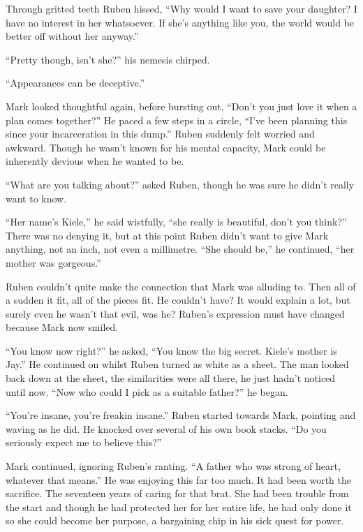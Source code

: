 Through gritted teeth Ruben hissed, ``Why would I want to save your daughter?  I have no interest in her whatsoever.  If she's anything like you, the world would be better off without her anyway.''

``Pretty though, isn't she?'' his nemesis chirped.

``Appearances can be deceptive.''

Mark looked thoughtful again, before bursting out,  ``Don't you just love it when a plan comes together?'' He paced a few steps in a circle, ``I've been planning this since your incarceration in this dump.''  Ruben suddenly felt worried and awkward.  Though he wasn't known for his mental capacity, Mark could be inherently devious when he wanted to be.  

``What are you talking about?'' asked Ruben, though he was sure he didn't really want to know.

``Her name's Kiele,'' he said wistfully, ``she really is beautiful, don't you think?''  There was no denying it, but at this point Ruben didn't want to give Mark anything, not an inch, not even a millimetre.  ``She should be,'' he continued, ``her mother was gorgeous.''

Ruben couldn't quite make the connection that Mark was alluding to.  Then all of a sudden it fit, all of the pieces fit.  He couldn't have?  It would explain a lot, but surely even he wasn't that evil, was he?  Ruben's expression must have changed because Mark now smiled.  

``You know now right?'' he asked, ``You know the big secret.  Kiele's mother is Jay.''  He continued on whilst Ruben turned as white as a sheet.  The man looked back down at the sheet, the similarities were all there, he just hadn't noticed until now.  ``Now who could I pick as a suitable father?'' he began.  

``You're insane, you're freakin insane.''  Ruben started towards Mark, pointing and waving as he did.  He knocked over several of his own book stacks.  ``Do you seriously expect me to believe this?''  

Mark continued, ignoring Ruben's ranting.  ``A father who was strong of heart, whatever that means.''  He was enjoying this far too much.  It had been worth the sacrifice.  The seventeen years of caring for that brat.  She had been trouble from the start and though he had protected her for her entire life, he had only done it so she could become her purpose, a bargaining chip in his sick quest for power.  

